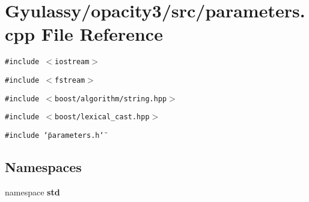 \section{Gyulassy/opacity3/src/parameters.cpp File Reference}
\label{parameters_8cpp}
{\tt \#include $<$iostream$>$}\par
{\tt \#include $<$fstream$>$}\par
{\tt \#include $<$boost/algorithm/string.hpp$>$}\par
{\tt \#include $<$boost/lexical\_\-cast.hpp$>$}\par
{\tt \#include \char`\"{}parameters.h\char`\"{}}\par
\subsection*{Namespaces}
\begin{CompactItemize}
\item 
namespace {\bf std}
\end{CompactItemize}
